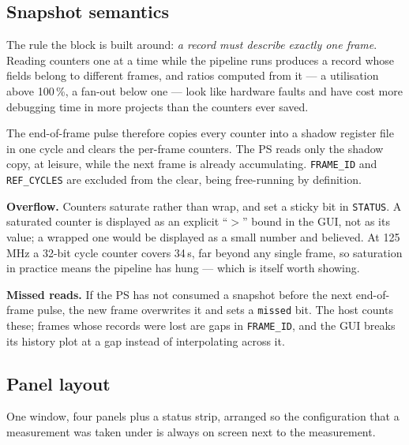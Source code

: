 \documentclass[11pt,a4paper]{article}
\newcommand{\field}[1]{\textbf{#1}\quad}
\begin{document}
\subsection{Snapshot semantics}

The rule the block is built around: \emph{a record must describe exactly one
frame}. Reading counters one at a time while the pipeline runs produces a record
whose fields belong to different frames, and ratios computed from it --- a
utilisation above 100\,\%, a fan-out below one --- look like hardware faults and
have cost more debugging time in more projects than the counters ever saved.

The end-of-frame pulse therefore copies every counter into a shadow register
file in one cycle and clears the per-frame counters. The PS reads only the
shadow copy, at leisure, while the next frame is already accumulating.
\texttt{FRAME\_ID} and \texttt{REF\_CYCLES} are excluded from the clear, being
free-running by definition.

\field{Overflow.} Counters saturate rather than wrap, and set a sticky bit in
\texttt{STATUS}. A saturated counter is displayed as an explicit
``$>$'' bound in the GUI, not as its value; a wrapped one would be displayed as
a small number and believed. At 125\,MHz a 32-bit cycle counter covers 34\,s,
far beyond any single frame, so saturation in practice means the pipeline has
hung --- which is itself worth showing.

\field{Missed reads.} If the PS has not consumed a snapshot before the next
end-of-frame pulse, the new frame overwrites it and sets a
\texttt{missed} bit. The host counts these; frames whose records were lost are
gaps in \texttt{FRAME\_ID}, and the GUI breaks its history plot at a gap instead
of interpolating across it.

\subsection{Panel layout}

One window, four panels plus a status strip, arranged so the configuration that
a measurement was taken under is always on screen next to the measurement.
\end{document}
